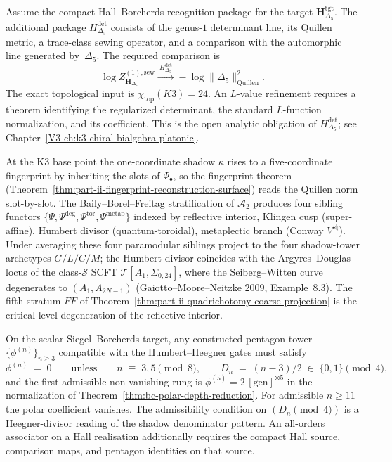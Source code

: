 \begin{theorem}
\label{thm:part-ii-k3-master-L-value}
Assume the compact Hall--Borcherds recognition package for the target
\(\mathbf H_{\Delta_5}^{\mathrm{tgt}}\).  The additional package
$H_{\Delta_5}^{\mathrm{det}}$ consists of the genus-$1$ determinant
line, its Quillen metric, a trace-class sewing operator, and a
comparison with the automorphic line generated by~$\Delta_5$.  The
required comparison is
\[
\log Z^{(1),\mathrm{sew}}_{\mathbf H_{\Delta_5}}
\xrightarrow{\ H_{\Delta_5}^{\mathrm{det}}\ }
-\log\bigl\|\Delta_5\bigr\|^2_{\mathrm{Quillen}}.
\]
The exact topological input is $\chi_{\mathrm{top}}(K3)=24$.
An $L$-value refinement requires a theorem identifying the regularized
determinant, the standard $L$-function normalization, and its
coefficient.  This is the open analytic obligation of
$H_{\Delta_5}^{\mathrm{det}}$; see
Chapter~\ref{V3-ch:k3-chiral-bialgebra-platonic}.
\end{theorem}

At the K3 base point the one-coordinate shadow $\kappa$ rises to
a five-coordinate fingerprint by inheriting the slots of
$\Psi_\bullet$, so the fingerprint theorem
(Theorem~\ref{thm:part-ii-fingerprint-reconstruction-surface}) reads
the Quillen norm slot-by-slot. The Baily--Borel--Freitag
stratification of $\overline{\mathcal A_2}$ produces four sibling
functors $\{\Psi,\Psi^{\deg},\Psi^{\mathrm{tor}},\Psi^{\mathrm{metap}}\}$
indexed by reflective interior, Klingen cusp (super-affine),
Humbert divisor (quantum-toroidal), metaplectic branch (Conway
$V^{s\natural}$). Under averaging these four paramodular siblings
project to the four shadow-tower archetypes $G/L/C/M$; the Humbert
divisor coincides with the Argyres--Douglas locus of the
class-$\mathcal S$ SCFT $\mathcal T[A_1,\Sigma_{0,24}]$, where the
Seiberg--Witten curve degenerates to $(A_1,A_{2N-1})$
(Gaiotto--Moore--Neitzke $2009$, Example~$8.3$). The fifth stratum
$FF$ of Theorem~\ref{thm:part-ii-quadrichotomy-coarse-projection}
is the critical-level degeneration of the reflective interior.

\medskip

\begin{remark}
\label{rem:part-ii-humbert-heegner}
On the scalar Siegel--Borcherds target, any constructed pentagon tower
\(\{\phi^{(n)}\}_{n\ge 3}\) compatible with the Humbert--Heegner gates
must satisfy
\[
\phi^{(n)} \;=\; 0
\qquad\text{unless}\qquad
n \;\equiv\; 3,5 \pmod 8,
\qquad
D_n \;=\; (n-3)/2 \;\in\; \{0,1\}\pmod 4,
\]
and the first admissible non-vanishing rung is
$\phi^{(5)} = 2\,[\mathrm{gen}]^{\otimes 5}$ in the normalization of
Theorem~\ref{thm:bc-polar-depth-reduction}. For admissible
$n\ge 11$ the polar coefficient vanishes. The admissibility condition
on $(D_n\pmod 4)$ is a Heegner-divisor reading of the shadow
denominator pattern.  An all-orders associator on a Hall realisation
additionally requires the compact Hall source, comparison maps, and
pentagon identities on that source.
\end{remark}

